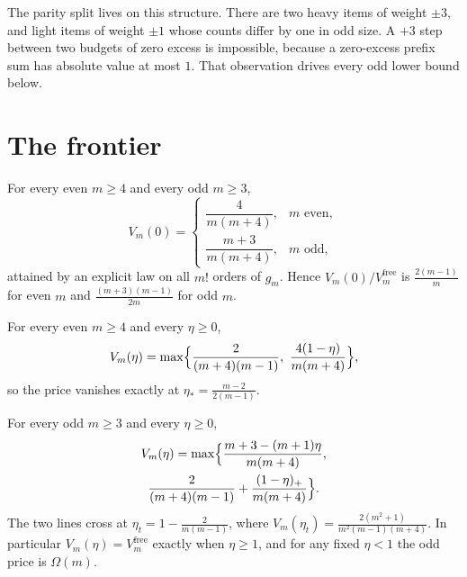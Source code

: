 The parity split lives on this structure. There are two heavy items of weight $\pm3$, and
light items of weight $\pm1$ whose counts differ by one in odd size. A $+3$ step between two
budgets of zero excess is impossible, because a zero-excess prefix sum has absolute value at
most $1$. That observation drives every odd lower bound below.

\section{The frontier}
\label{sec:frontier}

\begin{theorem}
\label{thm:zero}
For every even $m\ge4$ and every odd $m\ge3$,
\[
V_{m}(0)=
\begin{cases}
\dfrac{4}{m(m+4)}, & m\text{ even},\\[8pt]
\dfrac{m+3}{m(m+4)}, & m\text{ odd},
\end{cases}
\]
attained by an explicit law on all $m!$ orders of $g_{m}$. Hence
$V_{m}(0)/V^{\mathrm{free}}_{m}$ is $\frac{2(m-1)}{m}$ for even $m$ and
$\frac{(m+3)(m-1)}{2m}$ for odd $m$.
\end{theorem}


\begin{theorem}
\label{thm:even}
For every even $m\ge4$ and every $\eta\ge0$,
\[
V_{m}(\eta)=\max\Bigl\{\frac{2}{(m+4)(m-1)},\ \frac{4(1-\eta)}{m(m+4)}\Bigr\},
\]
so the price vanishes exactly at $\eta_{*}=\frac{m-2}{2(m-1)}$.
\end{theorem}


\begin{theorem}
\label{thm:odd}
For every odd $m\ge3$ and every $\eta\ge0$,
\begin{multline*}
V_{m}(\eta)=\max\Bigl\{\frac{m+3-(m+1)\eta}{m(m+4)},\\
\frac{2}{(m+4)(m-1)}+\frac{(1-\eta)_{+}}{m(m+4)}\Bigr\}.
\end{multline*}
The two lines cross at $\eta_{t}=1-\frac{2}{m(m-1)}$, where
$V_{m}(\eta_{t})=\frac{2(m^{2}+1)}{m^{2}(m-1)(m+4)}$. In particular
$V_{m}(\eta)=V^{\mathrm{free}}_{m}$ exactly when $\eta\ge1$, and for any fixed $\eta<1$ the
odd price is $\Omega(m)$.
\end{theorem}

